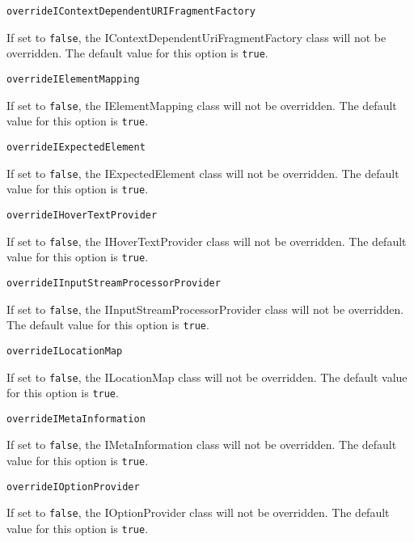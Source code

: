 \noindent\texttt{overrideIContextDependentURIFragmentFactory}
\begin{myindentpar}{1cm}
If set to \texttt{false}, the IContextDependentUriFragmentFactory class will not be overridden. The default value for this option is \texttt{true}.
\end{myindentpar}

\noindent\texttt{overrideIElementMapping}
\begin{myindentpar}{1cm}
If set to \texttt{false}, the IElementMapping class will not be overridden. The default value for this option is \texttt{true}.
\end{myindentpar}

\noindent\texttt{overrideIExpectedElement}
\begin{myindentpar}{1cm}
If set to \texttt{false}, the IExpectedElement class will not be overridden. The default value for this option is \texttt{true}.
\end{myindentpar}

\noindent\texttt{overrideIHoverTextProvider}
\begin{myindentpar}{1cm}
If set to \texttt{false}, the IHoverTextProvider class will not be overridden. The default value for this option is \texttt{true}.
\end{myindentpar}

\noindent\texttt{overrideIInputStreamProcessorProvider}
\begin{myindentpar}{1cm}
If set to \texttt{false}, the IInputStreamProcessorProvider class will not be overridden. The default value for this option is \texttt{true}.
\end{myindentpar}

\noindent\texttt{overrideILocationMap}
\begin{myindentpar}{1cm}
If set to \texttt{false}, the ILocationMap class will not be overridden. The default value for this option is \texttt{true}.
\end{myindentpar}

\noindent\texttt{overrideIMetaInformation}
\begin{myindentpar}{1cm}
If set to \texttt{false}, the IMetaInformation class will not be overridden. The default value for this option is \texttt{true}.
\end{myindentpar}

\noindent\texttt{overrideIOptionProvider}
\begin{myindentpar}{1cm}
If set to \texttt{false}, the IOptionProvider class will not be overridden. The default value for this option is \texttt{true}.
\end{myindentpar}

